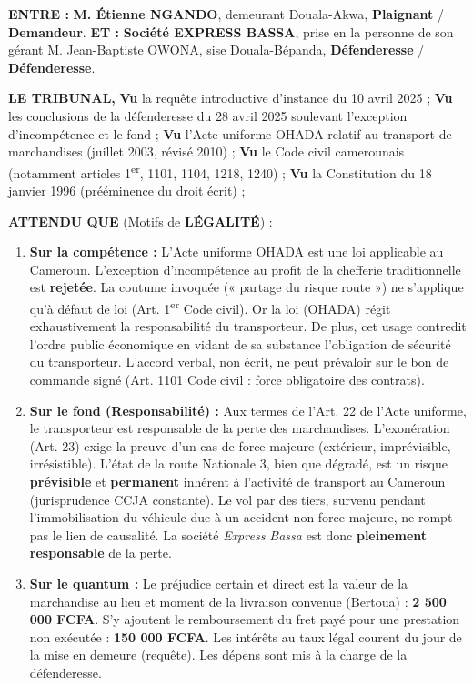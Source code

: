 \documentclass[11pt]{article}
\begin{document}
\begin{exoresolu}
\textbf{ENTRE :}
\textbf{M. Étienne NGANDO}, demeurant Douala-Akwa, \textbf{Plaignant} / \textbf{Demandeur}.
\textbf{ET :}
\textbf{Société EXPRESS BASSA}, prise en la personne de son gérant M. Jean-Baptiste OWONA, sise Douala-Bépanda, \textbf{Défenderesse} / \textbf{Défenderesse}.

\textbf{LE TRIBUNAL,}
\textbf{Vu} la requête introductive d'instance du 10 avril 2025 ;
\textbf{Vu} les conclusions de la défenderesse du 28 avril 2025 soulevant l'exception d'incompétence et le fond ;
\textbf{Vu} l'Acte uniforme OHADA relatif au transport de marchandises (juillet 2003, révisé 2010) ;
\textbf{Vu} le Code civil camerounais (notamment articles 1\textsuperscript{er}, 1101, 1104, 1218, 1240) ;
\textbf{Vu} la Constitution du 18 janvier 1996 (prééminence du droit écrit) ;

\textbf{ATTENDU QUE} (Motifs de \textbf{LÉGALITÉ}) :
\begin{enumerate}
    \item \textbf{Sur la compétence :} L'Acte uniforme OHADA est une loi applicable au Cameroun. L'exception d'incompétence au profit de la chefferie traditionnelle est \textbf{rejetée}. La coutume invoquée (« partage du risque route ») ne s'applique qu'à défaut de loi (Art. 1\textsuperscript{er} Code civil). Or la loi (OHADA) régit exhaustivement la responsabilité du transporteur. De plus, cet usage contredit l'ordre public économique en vidant de sa substance l'obligation de sécurité du transporteur. L'accord verbal, non écrit, ne peut prévaloir sur le bon de commande signé (Art. 1101 Code civil : force obligatoire des contrats).
    \item \textbf{Sur le fond (Responsabilité) :} Aux termes de l'Art. 22 de l'Acte uniforme, le transporteur est responsable de la perte des marchandises. L'exonération (Art. 23) exige la preuve d'un cas de force majeure (extérieur, imprévisible, irrésistible). L'état de la route Nationale 3, bien que dégradé, est un risque \textbf{prévisible} et \textbf{permanent} inhérent à l'activité de transport au Cameroun (jurisprudence CCJA constante). Le vol par des tiers, survenu pendant l'immobilisation du véhicule due à un accident non force majeure, ne rompt pas le lien de causalité. La société \textit{Express Bassa} est donc \textbf{pleinement responsable} de la perte.
    \item \textbf{Sur le quantum :} Le préjudice certain et direct est la valeur de la marchandise au lieu et moment de la livraison convenue (Bertoua) : \textbf{2 500 000 FCFA}. S'y ajoutent le remboursement du fret payé pour une prestation non exécutée : \textbf{150 000 FCFA}. Les intérêts au taux légal courent du jour de la mise en demeure (requête). Les dépens sont mis à la charge de la défenderesse.
\end{enumerate}


\end{exoresolu}
\end{document}
